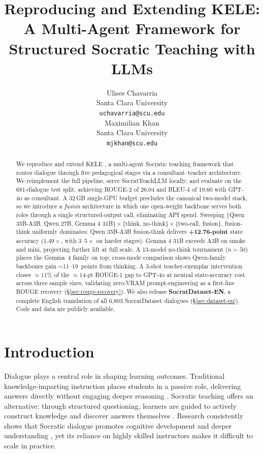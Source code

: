 \documentclass[11pt]{article}
\title{Reproducing and Extending KELE: A Multi-Agent Framework for Structured Socratic Teaching with LLMs}
\author{Ulises Chavarria \\
  Santa Clara University \\
  \texttt{uchavarria@scu.edu} \\\And
  Maximilian Khan \\
  Santa Clara University \\
  \texttt{mjkhan@scu.edu} \\}
\begin{document}
\maketitle

\begin{abstract}
We reproduce and extend KELE \citep{peng2025kele}, a multi-agent Socratic teaching framework that routes dialogue through five pedagogical stages via a consultant--teacher architecture. We reimplement the full pipeline, serve SocratTeachLLM locally, and evaluate on the 681-dialogue test split, achieving ROUGE-2 of 26.04 and BLEU-4 of 19.60 with GPT-4o as consultant. A 32\,GB single-GPU budget precludes the canonical two-model stack, so we introduce a \emph{fusion} architecture in which one open-weight backbone serves both roles through a single structured-output call, eliminating API spend. Sweeping $\{$Qwen 35B-A3B, Qwen 27B, Gemma 4 31B$\} \times \{$think, no-think$\} \times \{$two-call, fusion$\}$, fusion-think uniformly dominates: Qwen 35B-A3B fusion-think delivers \textbf{+12.76-point} state accuracy ($1.49\times$, with $3$--$5\times$ on harder stages). Gemma 4 31B exceeds A3B on smoke and mini, projecting further lift at full scale. A 13-model no-think tournament ($n{=}50$) places the Gemma~4 family on top; cross-mode comparison shows Qwen-family backbones gain $\sim$11--19~points from thinking. A 3-shot teacher-exemplar intervention closes $\approx 11\%$ of the $\approx 14$-pt ROUGE-1 gap to GPT-4o at neutral state-accuracy cost across three sample sizes, validating zero-VRAM prompt-engineering as a first-line ROUGE recovery (\S\ref{sec:rouge-recovery}). We also release \textbf{SocratDataset-EN}, a complete English translation of all 6,803 SocratDataset dialogues (\S\ref{sec:dataset-en}). Code and data are publicly available.
\end{abstract}

\section{Introduction}

Dialogue plays a central role in shaping learning outcomes. Traditional knowledge-imparting instruction places students in a passive role, delivering answers directly without engaging deeper reasoning \citep{johnston1994teaching}. Socratic teaching offers an alternative: through structured questioning, learners are guided to actively construct knowledge and discover answers themselves \citep{seeskin1987socratic, chang1998socratic}. Research consistently shows that Socratic dialogue promotes cognitive development and deeper understanding \citep{knezic2010socratic}, yet its reliance on highly skilled instructors makes it difficult to scale in practice.
\end{document}

